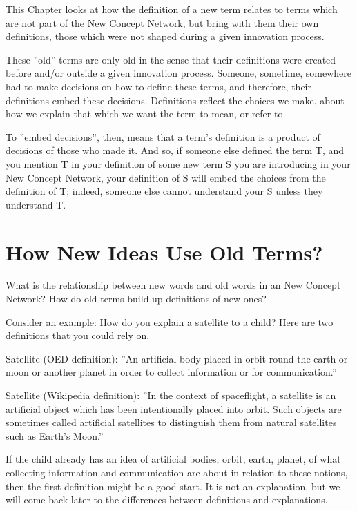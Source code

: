 \documentclass[graybox,envcountchap,sectrefs]{svmono}
\newcommand{\ncnf}{New Concept Network}
\begin{document}
This Chapter looks at how the definition of a new term relates to terms which are not part of the \ncnf{}, but bring with them their own definitions, those which were not shaped during a given innovation process.

These ''old'' terms are only old in the sense that their definitions were created before and/or outside a given innovation process. Someone, sometime, somewhere had to make decisions on how to define these terms, and therefore, their definitions embed these decisions. Definitions reflect the choices we make, about how we explain that which we want the term to mean, or refer to.

To ''embed decisions'', then, means that a term's definition is a product of decisions of those who made it. And so, if someone else defined the term T, and you mention T in your definition of some new term S you are introducing in your \ncnf{}, your definition of S will embed the choices from the definition of T; indeed, someone else cannot understand your S unless they understand T.

\section{How New Ideas Use Old Terms?}
\label{c6:s2}
What is the relationship between new words and old words in an \ncnf ? How do old terms build up definitions of new ones?

Consider an example: How do you explain a satellite to a child? Here are two definitions that you could rely on.

\begin{svgraybox}
Satellite (OED definition): ''An artificial body placed in orbit round the earth or moon or another planet in order to collect information or for communication.'' \cite{def-satellite}
\end{svgraybox}

\begin{svgraybox}
Satellite (Wikipedia definition): ''In the context of spaceflight, a satellite is an artificial object which has been intentionally placed into orbit. Such objects are sometimes called artificial satellites to distinguish them from natural satellites such as Earth's Moon.'' \cite{wikipedia-satellite}
\end{svgraybox}

If the child already has an idea of artificial bodies, orbit, earth, planet, of what collecting information and communication are about in relation to these notions, then the first definition might be a good start. It is not an explanation, but we will come back later to the differences between definitions and explanations.
\end{document}
